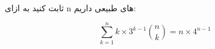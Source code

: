 \p    
ثابت کنید به ازای
 n
 ‌‌‌های
 ‌طبیعی داریم:

 \[
\sum\limits_{k=1}^{n}k\times3^{k-1}\binom{n}{k} = n\times4^{n-1}
\]
